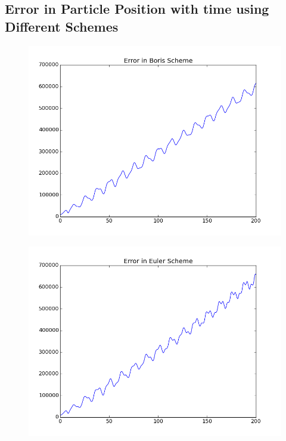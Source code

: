\documentclass[11pt, a4paper]{article}
\begin{document}
\subsection{Error in Particle Position with time using Different Schemes}
\begin{figure}[H]
 \centering
 \includegraphics[width = \textwidth]{q4_error_boris.png}
\end{figure}
\begin{figure}[H]
 \centering
 \includegraphics[width = \textwidth]{q4_error_Euler.png}
\end{figure}
\end{document}
